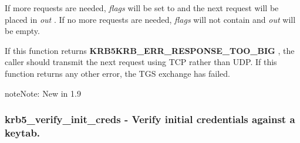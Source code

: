 \documentclass[letterpaper,10pt,english]{sphinxmanual}
\begin{document}
If more requests are needed, \emph{flags} will be set to {\hyperref[appdev/refs/macros/KRB5_TKT_CREDS_STEP_FLAG_CONTINUE:KRB5_TKT_CREDS_STEP_FLAG_CONTINUE]{}} and the next request will be placed in \emph{out} . If no more requests are needed, \emph{flags} will not contain {\hyperref[appdev/refs/macros/KRB5_TKT_CREDS_STEP_FLAG_CONTINUE:KRB5_TKT_CREDS_STEP_FLAG_CONTINUE]{}} and \emph{out} will be empty.

If this function returns \textbf{KRB5KRB\_ERR\_RESPONSE\_TOO\_BIG} , the caller should transmit the next request using TCP rather than UDP. If this function returns any other error, the TGS exchange has failed.

\begin{notice}{note}{Note:}
New in 1.9
\end{notice}


\subsubsection{krb5\_verify\_init\_creds -  Verify initial credentials against a keytab.}
\label{appdev/refs/api/krb5_verify_init_creds:krb5-verify-init-creds-verify-initial-credentials-against-a-keytab}\label{appdev/refs/api/krb5_verify_init_creds::doc}

\begin{fulllineitems}
\label{appdev/refs/api/krb5_verify_init_creds:c.krb5_verify_init_creds}
\end{fulllineitems}
\end{document}
